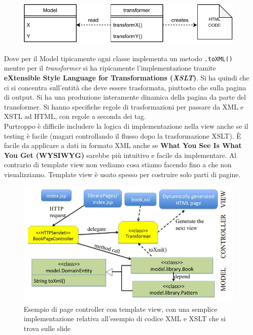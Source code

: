 \documentclass[a4paper,12pt, oneside]{book}
\begin{document}
\begin{itemize}
  \begin{figure}[H]
    \centering
    \includegraphics[scale = 0.7]{img/mvc8.pdf}
  \end{figure}
  Dove per il Model tipicamente ogni classe implementa un metodo
  \texttt{.toXML()} mentre per il \textit{transformer} si ha ripicamente
  l'implementazione tramite \textbf{eXtensible Style Language for
    Transformations (\textit{XSLT})}. Si ha quindi che ci si concentra
  sull'entità che deve essere trasformata, piuttosto che sulla pagina di
  output. Si ha una produzione interamente dinamica della pagina da parte del
  transformer. Si hanno specifiche regole di trasformazioni per passare da XML e
  XSTL ad HTML, con regole a seconda dei tag.\\
  Purtroppo è difficile includere la logica di implementazione nella view
  anche se il testing è facile (magari
  controllando il flusso dopo la trasformazione XSLT). È facile da applicare a
  dati in formato XML anche se \textbf{What You See Is What You Get (WYSIWYG)}
  sarebbe più intuitivo e facile da implementare. Al contrario di template view
  non vediamo cosa stiamo facendo fino a che non visualizziamo. Template view è
  usato spesso per costruire solo parti di pagine.
  \begin{figure}[H]
    \centering
    \includegraphics[scale = 0.4]{img/pgtv.jpg}
    \caption{Esempio di page controller con template view, con una semplice
      implementazione relativa all'esempio di codice XML e XSLT che si trova
      sulle slide}  
    \label{fig:fc}
  \end{figure}

\end{itemize}
\end{document}

